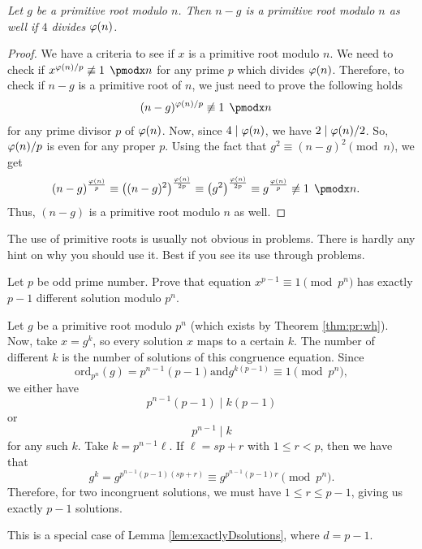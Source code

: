 \documentclass{subfile}
\begin{document}
	\begin{theorem}\slshape
		Let $g$ be a primitive root modulo $n$. Then $n-g$ is a primitive root modulo $n$ as well if $4$ divides $\varphi(n)$.
	\end{theorem}
	
	\begin{proof}
		We have a criteria to see if $x$ is a primitive root modulo $n$. We need to check if $x^{{\t(n)}/{p}}\not\equiv1\pmod n$ for any prime $p$ which divides $\varphi(n)$. Therefore, to check if $n-g$ is a primitive root of $n$, we just need to prove the following holds
		\begin{align*}
		(n-g)^{{\t(n)}/{p}} & \not\equiv1\pmod n
		\end{align*}
		for any prime divisor $p$ of $\varphi(n)$. Now, since $4 \mid \varphi(n)$, we have $2 \mid {\varphi(n)}/{2}$. So, ${\varphi(n)}/{p}$ is even for any proper $p$. Using the fact that $g^2\equiv(n-g)^2\pmod n$, we get
		\begin{align*}
		(n-g)^\frac{\t(n)}{p}   & \equiv\left((n-g)^2\right)^{\frac{\t(n)}{2p}} \equiv \left(g^2\right)^{\frac{\t(n)}{2p}}  \equiv g^{\frac{\t(n)}{p}} \not\equiv1\pmod n.
		\end{align*} 
		Thus, $(n-g)$ is a primitive root modulo $n$ as well.
	\end{proof}
The use of primitive roots is usually not obvious in problems. There is hardly any hint on why you should use it. Best if you see its use through problems.
	\begin{problem}
		Let $p$ be odd prime number. Prove that equation  $x^{p-1}\equiv 1 \pmod{p^n}$ has exactly $p -1$ different solution modulo $p^{n}$.
	\end{problem}
	
	\begin{solution}[1]
		Let $g$ be a primitive root modulo $p^n$ (which exists by Theorem \ref{thm:pr:wh}). Now, take $x=g^k$, so every solution $x$ maps to a certain $k$. The number of different $k$ is the number of solutions of this congruence equation. Since $$\text{ord}_{p^n}(g)=p^{n-1}(p-1) \text{and} g^{k(p-1)}\equiv1\pmod{p^n},$$  we either have $$p^{n-1}(p-1) \mid k(p-1)$$ or $$p^{n-1} \mid k$$ for any such $k$. Take $k=p^{n-1}\ell$. If $\ell=sp+r$ with $1\leq r<p$, then we have that $$g^k=g^{p^{n-1}(p-1)(sp+r)}\equiv g^{p^{n-1}(p-1)r}\pmod{p^n}.$$ Therefore, for two incongruent solutions, we must have $1\leq r\leq p-1$, giving us exactly $p-1$ solutions.
	\end{solution}
	
	\begin{solution}[2]
		This is a special case of Lemma \ref{lem:exactlyDsolutions}, where $d=p-1$.
	\end{solution}
	
\end{document}
